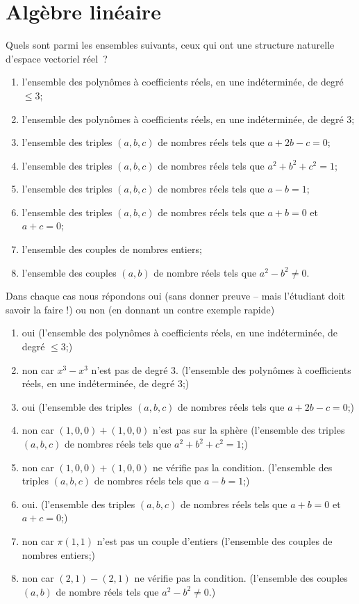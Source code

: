 \documentclass[12pt,french,oneside,a4paper]{memoir} %
\begin{document}
\chapter{Algèbre linéaire}
\begin{exo} %
Quels sont parmi les ensembles suivants, ceux qui ont une structure naturelle d'espace vectoriel réel~?
\begin{enumerate}
\item l'ensemble des polynômes à coefficients réels, en une indéterminée, 
de degré $\leq 3$;
\item l'ensemble des polynômes à coefficients réels, en une indéterminée, 
de degré 3;
\item l'ensemble des triples $(a,b,c)$ de nombres réels tels que $a+2b-c=0$;
\item l'ensemble des triples $(a,b,c)$ de nombres réels tels que $a^2+b^2+c^2=1$;
\item l'ensemble des triples $(a,b,c)$ de nombres réels tels que 
$a-b=1$;
\item l'ensemble des triples $(a,b,c)$ de nombres réels tels que $a+b=0$ et 
$a+c=0$;
\item l'ensemble des couples de nombres entiers;
\item l'ensemble des couples $(a,b)$ de nombre réels tels que 
$a^2-b^2 \neq 0$.
\end{enumerate}

\begin{correction}
Dans chaque cas nous répondons oui (sans donner preuve -- mais l'étudiant doit savoir la faire !) ou non (en donnant un contre exemple rapide)
\begin{enumerate}
\item oui (l'ensemble des polynômes à coefficients réels, en une indéterminée, de degré $\leq 3$;)
\item non car $x^{3} - x^{3}$ n'est pas de degré 3. (l'ensemble des polynômes à coefficients réels, en une indéterminée, de degré 3;)
\item oui (l'ensemble des triples $(a,b,c)$ de nombres réels tels que $a+2b-c=0$;)
\item non car $(1,0,0) + (1,0,0)$ n'est pas sur la  sphère (l'ensemble des triples $(a,b,c)$ de nombres réels tels que $a^2+b^2+c^2=1$;)
\item non car $(1,0,0) + (1,0,0)$ ne vérifie pas la condition. (l'ensemble des triples $(a,b,c)$ de nombres réels tels que $a-b=1$;)
\item oui. (l'ensemble des triples $(a,b,c)$ de nombres réels tels que $a+b=0$ et $a+c=0$;)
\item non car $\pi(1,1)$ n'est pas un couple d'entiers (l'ensemble des couples de nombres entiers;)
\item non car $(2,1)-(2,1)$ ne vérifie pas la condition. (l'ensemble des couples $(a,b)$ de nombre réels tels que $a^2-b^2 \neq 0$.)
\end{enumerate}  
\end{correction}
\end{exo}
\end{document}
